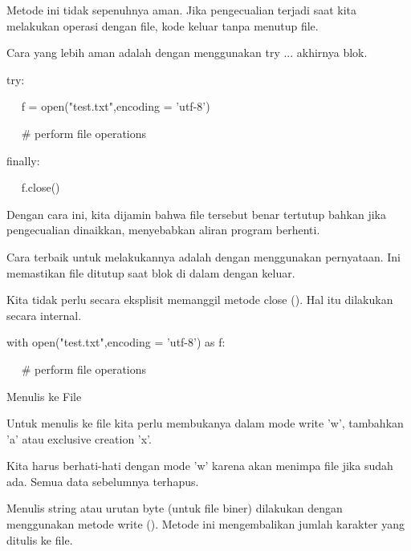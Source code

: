 \documentclass[a4paper,12pt]{report}
\begin{document}
Metode ini tidak sepenuhnya aman. Jika pengecualian terjadi saat kita melakukan operasi dengan file, kode keluar tanpa menutup file. \par
\vspace{12pt}
\noindent 
Cara yang lebih aman adalah dengan menggunakan try ... akhirnya blok. \par
\vspace{12pt}
\noindent 
try: \par
\noindent 
~~ f = open("test.txt",encoding = 'utf-8') \par
\noindent 
~~  $  \#  $ perform file operations \par
\noindent 
finally: \par
\noindent 
~~ f.close() \par
\vspace{12pt}
\noindent 
Dengan cara ini, kita dijamin bahwa file tersebut benar tertutup bahkan jika pengecualian dinaikkan, menyebabkan aliran program berhenti. \par
\vspace{12pt}
\noindent 
Cara terbaik untuk melakukannya adalah dengan menggunakan pernyataan. Ini memastikan file ditutup saat blok di dalam dengan keluar. \par
\vspace{12pt}
\noindent 
Kita tidak perlu secara eksplisit memanggil metode close (). Hal itu dilakukan secara internal. \par
\vspace{12pt}
\noindent 
with open("test.txt",encoding = 'utf-8') as f: \par
\noindent 
~~  $  \#  $ perform file operations \par
\vspace{12pt}
\vspace{12pt}
\vspace{12pt}
\vspace{12pt}
\noindent 
Menulis ke File \par
\vspace{12pt}
\noindent 
Untuk menulis ke file kita perlu membukanya dalam mode write 'w', tambahkan 'a' atau exclusive creation 'x'. \par
\vspace{12pt}
\noindent 
Kita harus berhati-hati dengan mode 'w' karena akan menimpa file jika sudah ada. Semua data sebelumnya terhapus. \par
\vspace{12pt}
\noindent 
Menulis string atau urutan byte (untuk file biner) dilakukan dengan menggunakan metode write (). Metode ini mengembalikan jumlah karakter yang ditulis ke file. \par
\end{document}
